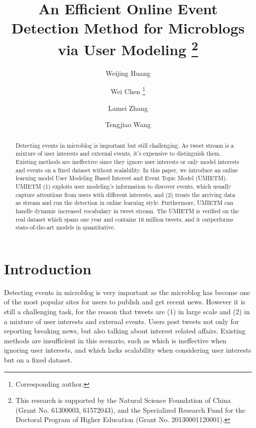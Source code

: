 \documentclass[runningheads,a4paper]{llncs}
\title{An Efficient Online Event Detection Method for Microblogs via User Modeling \thanks{This research is supported by the Natural Science Foundation of China (Grant No. 61300003, 61572043), and the Specialized Research Fund for the Doctoral Program of Higher Education (Grant No. 20130001120001).}}
\begin{document}
\author{Weijing Huang \and Wei Chen \thanks{Corresponding author.}\and Lamei Zhang\and Tengjiao Wang}
%
\maketitle
\thispagestyle{empty}
\pagestyle{empty}
%
%

\begin{abstract}
Detecting events in microblog is important but still challenging. As tweet stream is a mixture of user interests and external events, it’s expensive to distinguish them.
Existing methods are ineffective since they ignore user interests or only model interests and events on a fixed dataset without scalability. In this paper, we introduce an online learning model User Modeling Based Interest and Event Topic Model (UMIETM). UMIETM (1) exploits user modeling's information to discover events, which usually capture attentions from users with different interests, and (2) treats the arriving data as stream and run the detection in online learning style. Furthermore, UMIETM can handle dynamic increased vocabulary in tweet stream. The UMIETM is verified on the real dataset which spans one year and contains 16 million tweets, and it outperforms state-of-the-art models in quantitative.
\end{abstract}
\section{Introduction}
Detecting events in microblog is very important as the microblog has become one of the most popular sites for users to publish and get recent news.
However it is still a challenging task, for the reason that tweets are (1) in large scale and (2) in a mixture of user interests and external events.
Users post tweets not only for reporting breaking news, but also talking about interest related affairs.
Existing methods are insufficient in this scenario, such as \cite{lau2012line} which is ineffective when ignoring user interests, and \cite{timeUserLDA2012finding} which lacks scalability when considering user interests but on a fixed dataset.
\end{document}
